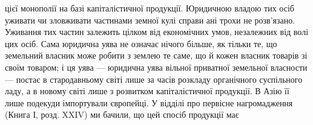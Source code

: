 цієї монополії на базі капіталістичної продукції. Юридичною владою тих осіб
уживати чи зловживати частинами земної кулі справи ані трохи не розв’язано.
Уживання тих частин залежить цілком від економічних умов, незалежних від
волі цих осіб. Сама юридична уява не означає нічого більше, як тільки те, що
земельний власник може робити з землею те саме, що й кожен власник
товарів зі своїм товаром; і ця уява — юридична уява вільної приватної земельної
власности — постає в стародавньому світі лише за часів розкладу органічного
суспільного ладу, а в новому світі лише з розвитком капіталістичної продукції.
В Азію її лише подекуди імпортували європейці. У відділі про первісне нагромадження
(Книга І, розд. XXIV) ми бачили, що цей спосіб продукції має
\parbreak{}  %
